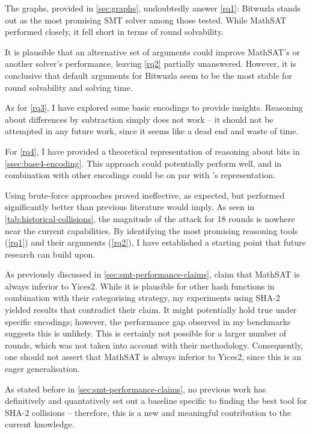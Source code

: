 \documentclass[a4paper]{report}
\begin{document}
The graphs, provided in \ref{sec:graphs}, undoubtedly answer \ref{rq1}: Bitwuzla \cite{bitwuzla} stands out as the most promising SMT solver among those tested.
While MathSAT \cite{MathSAT} performed closely, it fell short in terms of round solvability.

It is plausible that an alternative set of arguments could improve MathSAT's or another solver's performance, leaving \ref{rq2} partially unanswered.
However, it is conclusive that default arguments for Bitwuzla seem to be the most stable for round solvability and solving time.

As for \ref{rq3}, I have explored some basic encodings to provide insights.
Reasoning about differences by subtraction simply does not work -- it should not be attempted in any future work, since it seems like a dead end and waste of time.

For \ref{rq4}, I have provided a theoretical representation of reasoning about bits in \ref{ssec:base4-encoding}.
This approach could potentially perform well, and in combination with other encodings could be on par with \cite{li_2024}'s representation.

Using brute-force approaches proved ineffective, as expected, but performed significantly better than previous literature would imply.
As seen in \ref{tab:historical-collisions}, the magnitude of the attack for 18 rounds is nowhere near the current capabilities.
By identifying the most promising reasoning tools (\ref{rq1}) and their arguments (\ref{rq2}), I have established a starting point that future research can build upon.

As previously discussed in \ref{sec:smt-performance-claims}, \cite{bellini_2024} claim that MathSAT is always inferior to Yices2.
While it is plausible for other hash functions in combination with their categorising strategy, my experiments using SHA-2 yielded results that contradict their claim.
It might potentially hold true under specific encodings; however, the performance gap observed in my benchmarks suggests this is unlikely.
This is certainly not possible for a larger number of rounds, which was not taken into account with their methodology.
Consequently, one should not assert that MathSAT is always inferior to Yices2, since this is an eager generalisation.

As stated before in \ref{sec:smt-performance-claims}, no previous work has definitively and quantatively set out a baseline specific to finding the best tool for SHA-2 collisions -- therefore, this is a new and meaningful contribution to the current knowledge.
\end{document}

